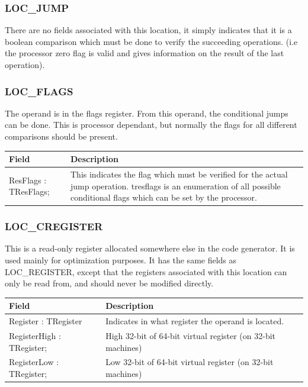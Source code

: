 \documentclass [a4paper,12pt]{article}
\begin{document}
\subsubsection{LOC{\_}JUMP}
\label{subsubsec:mylabel22}

There are no fields associated with this location, it simply indicates that
it is a boolean comparison which must be done to verify the succeeding
operations. (i.e the processor zero flag is valid and gives information on
the result of the last operation).

\subsubsection{LOC{\_}FLAGS}
\label{subsubsec:mylabel23}

The operand is in the flags register. From this operand, the conditional
jumps can be done. This is processor dependant, but normally the flags for
all different comparisons should be present.

\begin{longtable}{|l|p{10cm}|}
\hline
Field   & Description \\
\hline
\endhead
\hline
\endfoot
\textsf{ResFlags : TResFlags;}&
    This indicates the flag which must be verified for the actual jump
    operation. \textsf{tresflags }is an enumeration of all possible
    conditional flags which can be set by the processor. \\
\end{longtable}

\subsubsection{LOC{\_}CREGISTER}
\label{subsubsec:mylabel24}

This is a read-only register allocated somewhere else in the code generator.
It is used mainly for optimization purposes. It has the same fields as
LOC{\_}REGISTER, except that the registers associated with this location can
only be read from, and should never be modified directly.

\begin{longtable}{|l|p{10cm}|}
\hline
Field   & Description \\
\hline
\endhead
\hline
\endfoot
\textsf{Register : TRegister}&
    Indicates in what register the operand is located. \\
\textsf{RegisterHigh : TRegister;}&
    High 32-bit of 64-bit virtual register (on 32-bit machines) \\
\textsf{RegisterLow : TRegister;}&
    Low 32-bit of 64-bit virtual register (on 32-bit machines) \\
\end{longtable}
\end{document}
